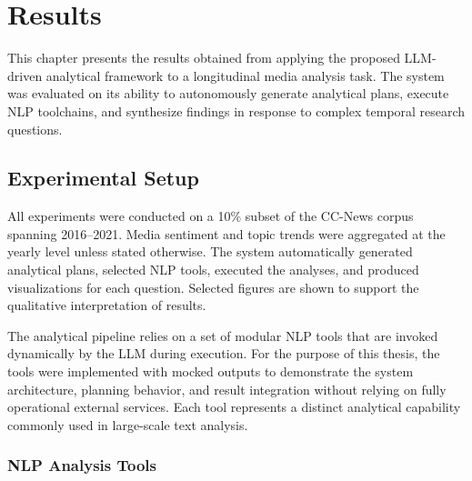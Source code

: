 


\chapter{Results} %

\label{ChapterResults} %

This chapter presents the results obtained from applying the proposed LLM-driven analytical framework to a longitudinal media analysis task. The system was evaluated on its ability to autonomously generate analytical plans, execute NLP toolchains, and synthesize findings in response to complex temporal research questions.


\section{Experimental Setup}

All experiments were conducted on a 10\% subset of the CC-News corpus spanning 2016–2021. Media sentiment and topic trends were aggregated at the yearly level unless stated otherwise. The system automatically generated analytical plans, selected NLP tools, executed the analyses, and produced visualizations for each question. Selected figures are shown to support the qualitative interpretation of results.

The analytical pipeline relies on a set of modular NLP tools that are invoked dynamically by the LLM during execution. For the purpose of this thesis, the tools were implemented with mocked outputs to demonstrate the system architecture, planning behavior, and result integration without relying on fully operational external services. Each tool represents a distinct analytical capability commonly used in large-scale text analysis.

\subsection{NLP Analysis Tools}

